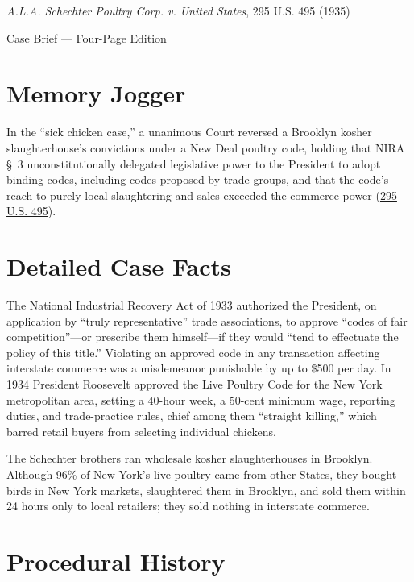 \documentclass[12pt]{article}
\begin{document}
\begin{center}
{\LARGE \textit{A.L.A. Schechter Poultry Corp. v. United States}, 295 U.S. 495 (1935)\par}
\vspace{0.8em}
{\large Case Brief --- Four-Page Edition\par}
\end{center}
\vspace{1em}

\section{Memory Jogger}

In the ``sick chicken case,'' a unanimous Court reversed a Brooklyn kosher slaughterhouse's convictions under a New Deal poultry code, holding that NIRA \S~3 unconstitutionally delegated legislative power to the President to adopt binding codes, including codes proposed by trade groups, and that the code's reach to purely local slaughtering and sales exceeded the commerce power (\href{https://supreme.justia.com/cases/federal/us/295/495/}{295 U.S. 495}).

\section{Detailed Case Facts}

The National Industrial Recovery Act of 1933 authorized the President, on application by ``truly representative'' trade associations, to approve ``codes of fair competition''---or prescribe them himself---if they would ``tend to effectuate the policy of this title.'' Violating an approved code in any transaction affecting interstate commerce was a misdemeanor punishable by up to \$500 per day. In 1934 President Roosevelt approved the Live Poultry Code for the New York metropolitan area, setting a 40-hour week, a 50-cent minimum wage, reporting duties, and trade-practice rules, chief among them ``straight killing,'' which barred retail buyers from selecting individual chickens.

The Schechter brothers ran wholesale kosher slaughterhouses in Brooklyn. Although 96\% of New York's live poultry came from other States, they bought birds in New York markets, slaughtered them in Brooklyn, and sold them within 24 hours only to local retailers; they sold nothing in interstate commerce.

\section{Procedural History}
\end{document}

